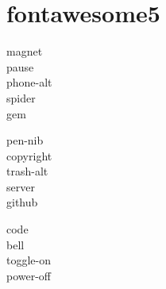

\chapter{fontawesome5}

\begin{minipage}[t]{0.25\textwidth}
	\vspace{0pt}
	\textcolor{red}{} magnet \\
	\textcolor{DarkGreen}{} pause \\
	\textcolor{CadetBlue}{} phone-alt \\
	\textcolor{Brown}{} spider \\
	\textcolor{PaleVioletRed}{} gem \\
\end{minipage}
\begin{minipage}[t]{0.25\textwidth}
	\vspace{0pt}
	\textcolor{Black}{} pen-nib \\
	\textcolor{Black}{} copyright \\
	\textcolor{DeepPink}{} trash-alt \\
	\textcolor{Black}{} server \\
	\textcolor{Black}{} github \\
\end{minipage}
\begin{minipage}[t]{0.25\textwidth}
	\vspace{0pt}
	\textcolor{Teal}{} code \\
	\textcolor{MediumPurple}{} bell \\
	\textcolor{Coral}{} toggle-on \\
	\textcolor{Black}{} power-off \\
\end{minipage}
